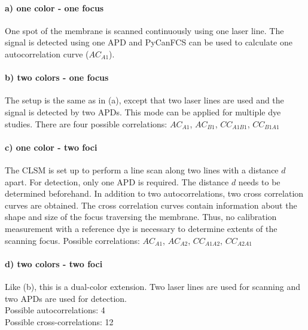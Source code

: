 \paragraph{a) one color - one focus}
One spot of the membrane is scanned continuously using one laser line. The signal is detected using one APD and PyCanFCS can be used to calculate one autocorrelation curve ($AC_{A1}$).
\paragraph{b) two colors - one focus}
The setup is the same as in (a), except that two laser lines are used and the signal is detected by two APDs. This mode can be applied for multiple dye studies. There are four possible correlations: $AC_{A1}$, $AC_{B1}$, $CC_{A1B1}$, $CC_{B1A1}$

\paragraph{c) one color - two foci}
The CLSM is set up to perform a line scan along two lines with a distance $d$ apart. For detection, only one APD is required. The distance $d$ needs to be determined beforehand. In addition to two autocorrelations, two cross correlation curves are obtained. The cross correlation curves contain information about the shape and size of the focus traversing the membrane. Thus, no calibration measurement with a reference dye is necessary to determine extents of the scanning focus.
Possible correlations: $AC_{A1}$, $AC_{A2}$, $CC_{A1A2}$, $CC_{A2A1}$


\paragraph{d) two colors - two foci}
Like (b), this is a dual-color extension. Two laser lines are used for scanning and two APDs are used for detection.\\
Possible autocorrelations: 4\\
Possible cross-correlations: 12

